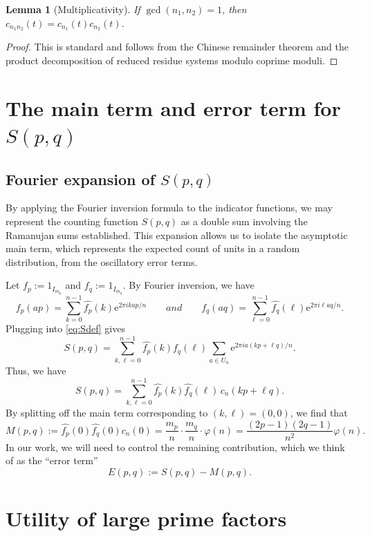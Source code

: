 \documentclass[12pt]{amsart}
\newtheorem{lemma}[theorem]{Lemma}
\newcommand{\e}{\mathrm{e}}
\begin{document}
\begin{lemma}[Multiplicativity]
\label{lem:ramanujanMult}
If $\gcd(n_1,n_2)=1$, then $c_{n_1n_2}(t)=c_{n_1}(t)c_{n_2}(t)$.
\end{lemma}

\begin{proof}
This is standard and follows from the Chinese remainder theorem and the product decomposition of reduced residue systems modulo coprime moduli.
\end{proof}

\section{The main term and error term for {$S(p,q)$}}\label{Section4}

\subsection{Fourier expansion of {$S(p,q)$}} 
By applying the Fourier inversion formula to the indicator functions, we may represent the counting function $S(p,q)$ as a double sum involving the Ramanujan sums established. This expansion allows us to isolate the asymptotic main term, which represents the expected count of units in a random distribution, from the oscillatory error terms.

Let $f_p:=1_{I_{m_p}}$ and $f_q:=1_{I_{m_q}}$.
By Fourier inversion, we have
\[
f_p(ap)=\sum_{k=0}^{n-1}\widehat{f_p}(k)\e^{2\pi i k ap/n}
\qquad and \qquad
f_q(aq)=\sum_{\ell=0}^{n-1}\widehat{f_q}(\ell)\e^{2\pi i \ell a q/n}.
\]
Plugging into \eqref{eq:Sdef} gives
\[
S(p,q)=\sum_{k,\ell=0}^{n-1}\widehat{f_p}(k)\widehat{f_q}(\ell)\sum_{a\in U_n}\e^{2\pi i a(kp+\ell q)/n}.
\]
Thus, we have
\begin{equation}
\label{eq:Sexpansion}
S(p,q)=\sum_{k,\ell=0}^{n-1}\widehat{f_p}(k)\widehat{f_q}(\ell)\,c_n(kp+\ell q).
\end{equation}
By splitting off the main term corresponding to $(k,\ell)=(0,0)$, we find that
\[
M(p,q):=\widehat{f_p}(0)\widehat{f_q}(0)c_n(0)=\frac{m_p}{n}\cdot\frac{m_q}{n}\cdot\varphi(n)
=\frac{(2p-1)(2q-1)}{n^2}\varphi(n).
\]
In our work, we will need to control the remaining contribution, which we think of as the ``error term''
\begin{equation}\label{Error}
E(p,q):=S(p,q)-M(p,q).
\end{equation}


\section{Utility of large prime factors}\label{Section5}
\end{document}
